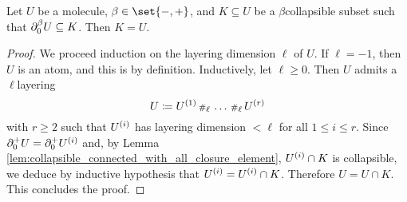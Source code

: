 \begin{lem} \label{lem:collapsible_beta_boundary_collapse_all}
    Let \( U \) be a molecule, \( \beta \in \set{-, +} \), and \( K \subseteq U \) be a \( \beta \)\nbd collapsible subset such that \( \bd{0}{\beta} U \subseteq K \).
    Then \( K = U \).
\end{lem}
\begin{proof}
    We proceed induction on the layering dimension \( \ell \) of \( U \).
    If \( \ell = -1 \), then \( U \) is an atom, and this is by definition.
    Inductively, let \( \ell \geq 0 \). Then \( U \) admits a \( \ell \)\nbd layering
    \begin{equation*}
        U \eqdef \order{1}{U} \cp{\ell} \ldots \cp{\ell} \order{r}{U}
    \end{equation*}
    with \( r \geq 2 \) such that \( \order{i}{U} \) has layering dimension \( < \ell \) for all \( 1 \le i \le r \).
    Since \( \bd{0}{+} U = \bd{0}{+} \order{i}{U} \) and, by Lemma \ref{lem:collapsible_connected_with_all_closure_element}, \( \order{i}{U} \cap K \) is collapsible, we deduce by inductive hypothesis that \( \order{i}{U} = \order{i}{U} \cap K \).
    Therefore \( U = U \cap K \).
    This concludes the proof.
\end{proof}

